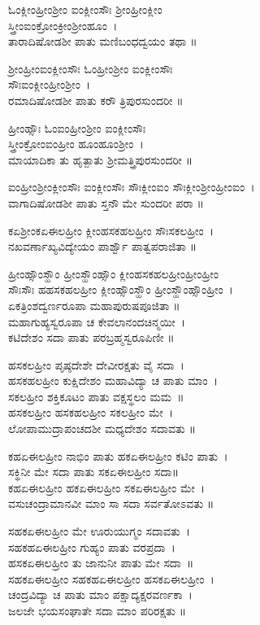 ಓಂಕ್ಲೀಂಹ್ರೀಂಶ್ರೀಂ ಐಂಕ್ಲೀಂಸೌಃ  ಶ್ರೀಂಹ್ರೀಂಕ್ಲೀಂ\\ ಸ್ತ್ರೀಂಐಂಕ್ರೋಂಕ್ರೀಂಶ್ರೀಂಹೂಂ~।\\
ತಾರಾದಿಷೋಡಶೀ ಪಾತು ಮಣಿಬಂಧದ್ವಯಂ ತಥಾ ॥

ಶ್ರೀಂಹ್ರೀಂಐಂಕ್ಲೀಂಸೌಃ ಓಂಹ್ರೀಂಶ್ರೀಂ ಐಂಕ್ಲೀಂಸೌಃ\\ ಸೌಃಐಂಕ್ಲೀಂಹ್ರೀಂಶ್ರೀಂ~।\\
ರಮಾದಿಷೋಡಶೀ ಪಾತು ಕರೌ ತ್ರಿಪುರಸುಂದರೀ ॥

ಹ್ರೀಂಹ್ಸೌಃ ಓಂಐಂಹ್ರೀಂಶ್ರೀಂ ಐಂಕ್ಲೀಂಸೌಃ \\ಸ್ತ್ರೀಂಕ್ರೋಂಐಂಹ್ರೀಂ ಹೂಂಹೂಂಶ್ರೀಂ~।\\
ಮಾಯಾದಿಕಾ ತು ಹೃತ್ಪಾತು ಶ್ರೀಮತ್ತ್ರಿಪುರಸುಂದರೀ ॥

ಐಂಹ್ರೀಂಶ್ರೀಂಕ್ಲೀಂಸೌಃ ಐಂಕ್ಲೀಂಸೌಃ ಸೌಃಕ್ಲೀಂಐಂ ಸೌಃಕ್ಲೀಂಶ್ರೀಂಹ್ರೀಂಐಂ~।\\
ವಾಗಾದಿಷೋಡಶೀ ಪಾತು ಸ್ತನೌ ಮೇ ಸುಂದರೀ ಪರಾ ॥

ಕಏಶ್ರೀಂಕಏಈಲಹ್ರೀಂ ಕ್ಲೀಂಹಸಕಹಲಹ್ರೀಂ ಸೌಃಸಕಲಹ್ರೀಂ~।\\
ನಖವರ್ಣಾಖ್ಯವಿದ್ಯೇಯಂ ಪಾರ್ಶ್ವೌ ಪಾತ್ವಪರಾಜಿತಾ ॥

ಹ್ರೀಂಹ್ಸೌಂಸ್ಹೌಂ ಹ್ರೀಂಸ್ಹೌಂಹ್ಸೌಂ ಕ್ಲೀಂಹಸಕಹಲಹ್ರೀಂಹ್ರೀಂಹ್ರೀಂ\\ ಸೌಃಸೌಃ ಹಹಸಕಹಲಹ್ರೀಂ ಕ್ಲೀಂಹ್ಸೌಂಸ್ಹೌಂ ಹ್ರೀಂಸ್ಹೌಂಹ್ಸೌಂಹ್ರೀಂ~।\\
ಏಕತ್ರಿಂಶದ್ವರ್ಣರೂಪಾ ಮಹಾಪುರುಷಪೂಜಿತಾ ॥\\
ಮಹಾಗುಹ್ಯಸ್ವರೂಪಾ ಚ ಕೇವಲಾನಂದಚಿನ್ಮಯೀ~।\\
ಕಟಿದೇಶಂ ಸದಾ ಪಾತು ಪರಬ್ರಹ್ಮಸ್ವರೂಪಿಣೀ ॥

ಹಸಕಲಹ್ರೀಂ ಪೃಷ್ಠದೇಶೇ ದೇವೀರಕ್ಷತು ವೈ ಸದಾ~।\\
ಹಸಕಹಲಹ್ರೀಂ ಕುಕ್ಷಿದೇಶಂ ಮಹಾವಿದ್ಯಾ ಚ ಪಾತು ಮಾಂ~।\\
ಸಕಲಹ್ರೀಂ ಶಕ್ತಿಕೂಟಂ ಪಾತು ವಕ್ಷಸ್ಥಲಂ ಮಮ~॥\\
ಹಸಕಲಹ್ರೀಂ ಹಸಕಹಲಹ್ರೀಂ ಸಕಲಹ್ರೀಂ ಮೇ~।\\
ಲೋಪಾಮುದ್ರಾಪಂಚದಶೀ ಮಧ್ಯದೇಶಂ ಸದಾವತು ॥

ಕಹಏಈಲಹ್ರೀಂ ನಾಭಿಂ ಪಾತು ಹಕಏಈಲಹ್ರೀಂ ಕಟಿಂ ಪಾತು~।\\
ಸಕ್ಥಿನೀ ಮೇ ಸದಾ ಪಾತು ಸಕಏಈಲಹ್ರೀಂ ಸದಾ॥\\
ಕಹಏಈಲಹ್ರೀಂ ಹಕಏಈಲಹ್ರೀಂ ಸಕಏಈಲಹ್ರೀಂ ಮೇ~।\\
ವಸುಚಂದ್ರಾಮಾನವೀ ಮಾಂ ಸಾ ಸದಾ ಸರ್ವತೋಽವತು ॥

ಸಹಕಏಈಲಹ್ರೀಂ ಮೇ ಊರುಯುಗ್ಮಂ ಸದಾವತು~।\\
ಸಹಕಹಏಈಲಹ್ರೀಂ ಗುಹ್ಯಂ ಪಾತು ವರಪ್ರದಾ~।\\
ಹಸಕಏಈಲಹ್ರೀಂ ತು ಜಾನುನೀ ಪಾತು ಮೇ ಸದಾ~॥\\
ಸಹಕಏಈಲಹ್ರೀಂ ಸಹಕಹಏಈಲಹ್ರೀಂ ಹಸಕಏಈಲಹ್ರೀಂ~।\\
ಚಂದ್ರವಿದ್ಯಾ ಚ ಪಾತು ಮಾಂ ಪಕ್ಷಾದ್ಯಕ್ಷರವರ್ಣಕಾ~।\\
ಜಲಜೇ ಭಯಸಂಘಾತೇ ಸದಾ ಮಾಂ ಪರಿರಕ್ಷತು ॥

